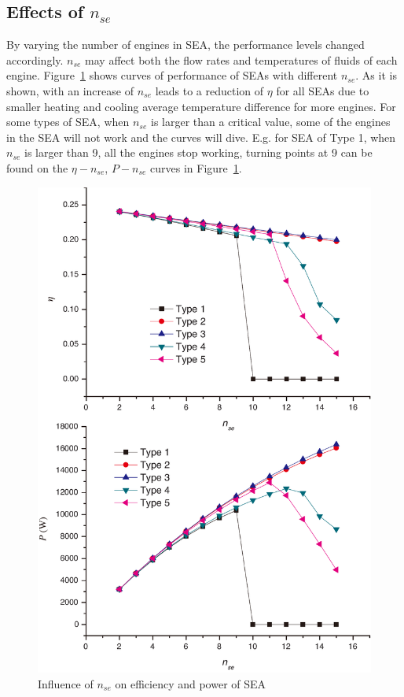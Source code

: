 \documentclass[preprint,5p, twocolumn]{elsarticle}
\begin{document}
\subsection{Effects of $n_{se}$}

By varying the number of engines in SEA, the performance levels changed accordingly. $n_{se}$ may affect both the flow rates and temperatures of fluids of each engine. Figure~\ref{fig:n_se} shows curves of performance of SEAs with different $n_{se}$. As it is shown, with an increase of $n_{se}$ leads to a reduction of $\eta$ for all SEAs due to smaller heating and cooling average temperature difference for more engines. For some types of SEA, when $n_{se}$ is larger than a critical value, some of the engines in the SEA will not work and the curves will dive. E.g. for SEA of Type 1, when $n_{se}$ is larger than 9, all the engines stop working, turning points at 9 can be found on the $\eta-n_{se}$, $P-n_{se}$ curves in Figure~\ref{fig:n_se}.

\noindent \begin{figure}[htbp]
\begin{center}
	\includegraphics[width = 0.7\columnwidth]{./graphics/n_se}
	\caption{Influence of $n_{se}$ on efficiency and power of SEA}
	\label{fig:n_se}
\end{center}
\end{figure}
\end{document}
